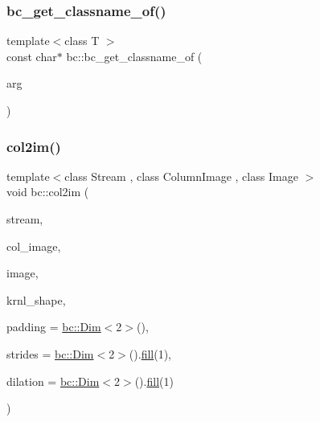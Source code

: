 \subsubsection{\texorpdfstring{bc\+\_\+get\+\_\+classname\+\_\+of()}{bc\_get\_classname\_of()}}
{\footnotesize\ttfamily template$<$class T $>$ \\
const char$\ast$ bc\+::bc\+\_\+get\+\_\+classname\+\_\+of (\begin{DoxyParamCaption}\item[{const T \&}]{arg }\end{DoxyParamCaption})\hspace{0.3cm}{\ttfamily [inline]}}

\mbox{\label{namespacebc_a317a45582372bf3a2b0c9969f0ea877a}} 
\subsubsection{\texorpdfstring{col2im()}{col2im()}}
{\footnotesize\ttfamily template$<$class Stream , class Column\+Image , class Image $>$ \\
void bc\+::col2im (\begin{DoxyParamCaption}\item[{\hyperlink{classbc_1_1streams_1_1Stream}{Stream}}]{stream,  }\item[{Column\+Image}]{col\+\_\+image,  }\item[{Image}]{image,  }\item[{\hyperlink{structbc_1_1Dim}{bc\+::\+Dim}$<$ 3 $>$}]{krnl\+\_\+shape,  }\item[{\hyperlink{structbc_1_1Dim}{bc\+::\+Dim}$<$ 2 $>$}]{padding = {\ttfamily \hyperlink{structbc_1_1Dim}{bc\+::\+Dim}$<$2$>$()},  }\item[{\hyperlink{structbc_1_1Dim}{bc\+::\+Dim}$<$ 2 $>$}]{strides = {\ttfamily \hyperlink{structbc_1_1Dim}{bc\+::\+Dim}$<$2$>$().\hyperlink{tensor__iteralgos_8h_afd10a40f252abd24d1faa2752becdd53}{fill}(1)},  }\item[{\hyperlink{structbc_1_1Dim}{bc\+::\+Dim}$<$ 2 $>$}]{dilation = {\ttfamily \hyperlink{structbc_1_1Dim}{bc\+::\+Dim}$<$2$>$().\hyperlink{tensor__iteralgos_8h_afd10a40f252abd24d1faa2752becdd53}{fill}(1)} }\end{DoxyParamCaption})}

\mbox{\label{namespacebc_a28c12b5b6f9955c77a8c4b0cf047cfb6}} 
